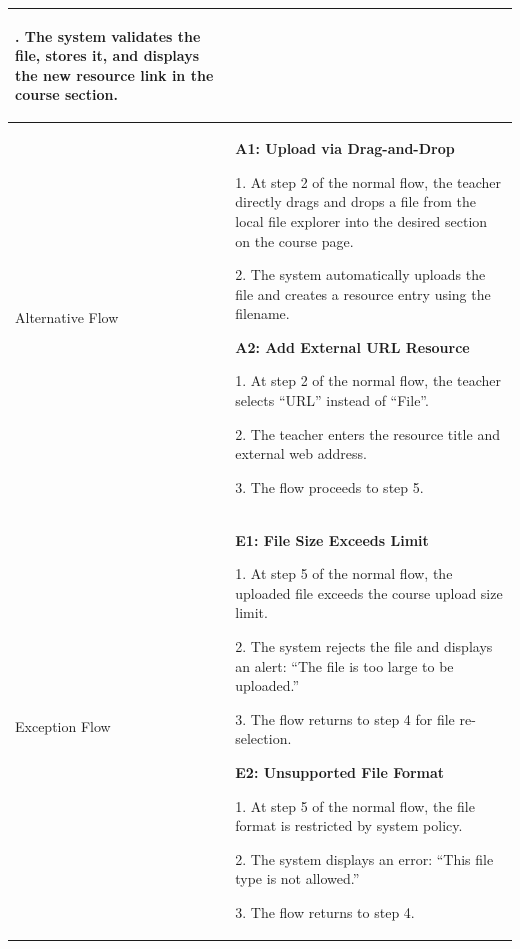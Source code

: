{\begin{longtable}{|>{\bfseries\raggedright\arraybackslash}p{}|>{\raggedright\arraybackslash}p{}|}
6. The system validates the file, stores it, and displays the new resource link in the course section. \\ \hline
Alternative Flow &
\textbf{A1: Upload via Drag-and-Drop} \par
1. At step 2 of the normal flow, the teacher directly drags and drops a file from the local file explorer into the desired section on the course page. \par
2. The system automatically uploads the file and creates a resource entry using the filename. \par\vspace{4pt}
\textbf{A2: Add External URL Resource} \par
1. At step 2 of the normal flow, the teacher selects ``URL'' instead of ``File''. \par
2. The teacher enters the resource title and external web address. \par
3. The flow proceeds to step 5. \\ \hline
Exception Flow &
\textbf{E1: File Size Exceeds Limit} \par
1. At step 5 of the normal flow, the uploaded file exceeds the course upload size limit. \par
2. The system rejects the file and displays an alert: ``The file is too large to be uploaded.'' \par
3. The flow returns to step 4 for file re-selection. \par\vspace{4pt}
\textbf{E2: Unsupported File Format} \par
1. At step 5 of the normal flow, the file format is restricted by system policy. \par
2. The system displays an error: ``This file type is not allowed.'' \par
3. The flow returns to step 4. \\ \hline
\end{longtable}
}

